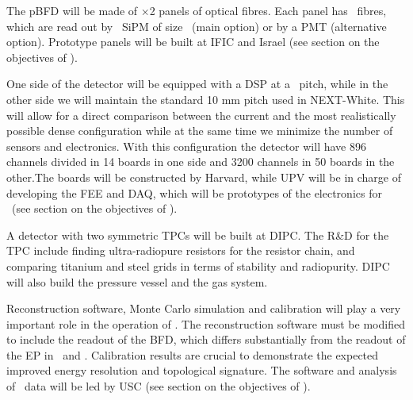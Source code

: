 \indent

The pBFD will be made of \pBFDNP$\times$2 panels of optical fibres. Each panel has \pBFDNFPP\ fibres, which are read out by \pBFDNSIPMPP\ SiPM
of size \pBFDNSIPM\ (main option) or by a PMT (alternative option). Prototype panels will be built at IFIC and Israel (see section on the objectives of \sIFIC).

\indent

One side of the detector will be equipped with a DSP at a \pDSP\ pitch, while in the other side we will maintain the standard 10 mm pitch used in NEXT-White. This will allow for a direct comparison between the current and the most realistically possible dense configuration while at the same time we minimize the number of sensors and electronics. With this configuration the detector will have 896 channels divided in 14 boards in one side and 3200 channels in 50 boards in the other.The boards will be constructed by Harvard, while UPV will be in charge of developing the FEE and DAQ, which will be prototypes of the electronics for \NHD\ (see section on the objectives of \sUPV).



\indent

A detector with two symmetric TPCs will be built at DIPC. The R\&D for the TPC include finding ultra-radiopure resistors for the resistor chain, and comparing titanium and
steel grids in terms of stability and radiopurity. DIPC will also build the pressure vessel and the gas system. 

\indent

Reconstruction software, Monte Carlo simulation and calibration will play a very important role in the operation of \HDEMO. The reconstruction software must be modified to include the readout of the BFD, which differs substantially from the readout of the EP in \NEW\ and \Next. Calibration results are crucial to demonstrate the expected improved energy resolution and topological signature. The software and analysis of \HDEMO\ data will be led by USC  (see section on the objectives of \sUSC).



